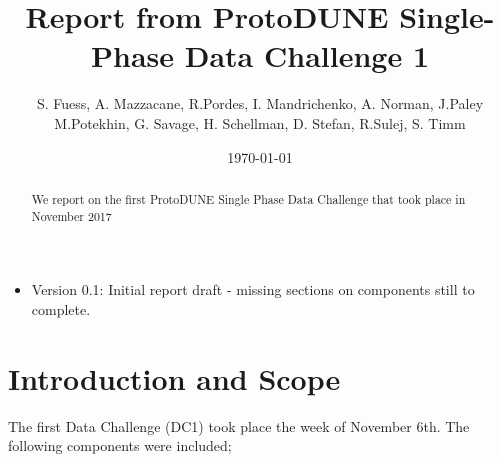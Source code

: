 \documentclass[pdftex,12pt,letter]{article}
\title{Report from ProtoDUNE Single-Phase Data Challenge 1}
\date{\today}
\author{S. Fuess, A. Mazzacane, R.Pordes, I. Mandrichenko, A. Norman, J.Paley \\
M.Potekhin, G. Savage, H. Schellman, D. Stefan, R.Sulej, S. Timm}
\begin{document}
\maketitle
\begin{abstract}
\noindent We report on the first ProtoDUNE Single Phase Data Challenge that took place in November 2017
\end{abstract}


\begin{itemize}
\item Version 0.1: Initial report draft - missing sections on components still to complete.
\clearpage
\end{itemize}

\tableofcontents
\pagebreak



\section{Introduction and Scope}

The first Data Challenge  (DC1) took place the week of November 6th. The following components were included; 
\end{document}
